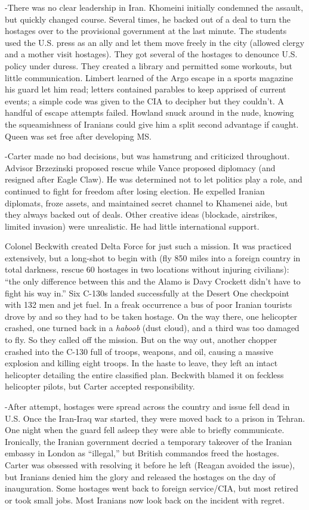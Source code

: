 \documentclass[
]{article}
\begin{document}
-There was no clear leadership in Iran. Khomeini initially condemned the
assault, but quickly changed course. Several times, he backed out of a
deal to turn the hostages over to the provisional government at the last
minute. The students used the U.S. press as an ally and let them move
freely in the city (allowed clergy and a mother visit hostages). They
got several of the hostages to denounce U.S. policy under duress. They
created a library and permitted some workouts, but little communication.
Limbert learned of the Argo escape in a sports magazine his guard let
him read; letters contained parables to keep apprised of current events;
a simple code was given to the CIA to decipher but they couldn't. A
handful of escape attempts failed. Howland snuck around in the nude,
knowing the squeamishness of Iranians could give him a split second
advantage if caught. Queen was set free after developing MS.

-Carter made no bad decisions, but was hamstrung and criticized
throughout. Advisor Brzezinski proposed rescue while Vance proposed
diplomacy (and resigned after Eagle Claw). He was determined not to let
politics play a role, and continued to fight for freedom after losing
election. He expelled Iranian diplomats, froze assets, and maintained
secret channel to Khamenei aide, but they always backed out of deals.
Other creative ideas (blockade, airstrikes, limited invasion) were
unrealistic. He had little international support.

Colonel Beckwith created Delta Force for just such a mission. It was
practiced extensively, but a long-shot to begin with (fly 850 miles into
a foreign country in total darkness, rescue 60 hostages in two locations
without injuring civilians): ``the only difference between this and the
Alamo is Davy Crockett didn't have to fight his way in.'' Six C-130s
landed successfully at the Desert One checkpoint with 132 men and jet
fuel. In a freak occurrence a bus of poor Iranian tourists drove by and
so they had to be taken hostage. On the way there, one helicopter
crashed, one turned back in a \emph{haboob} (dust cloud), and a third
was too damaged to fly. So they called off the mission. But on the way
out, another chopper crashed into the C-130 full of troops, weapons, and
oil, causing a massive explosion and killing eight troops. In the haste
to leave, they left an intact helicopter detailing the entire classified
plan. Beckwith blamed it on feckless helicopter pilots, but Carter
accepted responsibility.

-After attempt, hostages were spread across the country and issue fell
dead in U.S. Once the Iran-Iraq war started, they were moved back to a
prison in Tehran. One night when the guard fell asleep they were able to
briefly communicate. Ironically, the Iranian government decried a
temporary takeover of the Iranian embassy in London as ``illegal,'' but
British commandos freed the hostages. Carter was obsessed with resolving
it before he left (Reagan avoided the issue), but Iranians denied him
the glory and released the hostages on the day of inauguration. Some
hostages went back to foreign service/CIA, but most retired or took
small jobs. Most Iranians now look back on the incident with regret.
\end{document}
